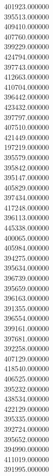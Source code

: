401923.000000\\
395513.000000\\
409410.000000\\
407760.000000\\
399229.000000\\
424794.000000\\
397743.000000\\
412663.000000\\
410704.000000\\
396442.000000\\
423432.000000\\
397797.000000\\
407510.000000\\
421449.000000\\
197219.000000\\
395579.000000\\
395842.000000\\
395147.000000\\
405829.000000\\
397434.000000\\
417248.000000\\
396113.000000\\
445338.000000\\
400065.000000\\
405984.000000\\
394275.000000\\
395634.000000\\
396739.000000\\
395659.000000\\
396163.000000\\
391355.000000\\
396554.000000\\
399161.000000\\
397681.000000\\
392258.000000\\
407129.000000\\
418540.000000\\
406525.000000\\
395232.000000\\
438534.000000\\
422129.000000\\
395335.000000\\
392724.000000\\
395652.000000\\
394990.000000\\
411019.000000\\
391995.000000\\
